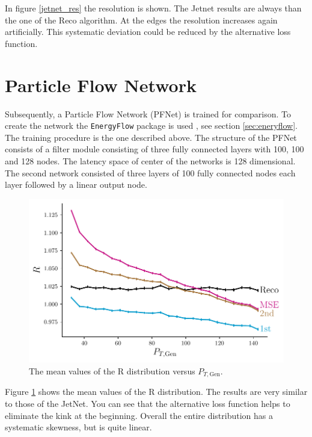 \documentclass[12pt, a4paper]{thesis}
\begin{document}
In figure \ref{jetnet_res} the resolution is shown. The Jetnet results
are always than the one of the Reco algorithm. At the edges the
resolution increases again artificially. This systematic deviation
could be reduced by the alternative loss function.

\clearpage
\section{Particle Flow Network}
\label{sec:org307355e}

Subsequently, a Particle Flow Network (PFNet) is trained for
comparison. To create the network the \texttt{EnergyFlow} package is
used \cite{komiske19_energ_flow_networ}, see section
\ref{sec:eneryflow}. The training procedure is the one described
above. The structure of the PFNet consists of a filter module
consisting of three fully connected layers with 100, 100 and 128
nodes. The latency space of center of the networks is 128
dimensional. The second network consisted of three layers of 100 fully
connected nodes each layer followed by a linear output node.

\begin{figure}[hbtp]
  \centering
  \includegraphics[width=.9\linewidth]{../images/pfnet_R.pdf}
  \caption{The mean values of the R distribution versus \(P_{T,
      \text{Gen}}\).}
  \label{pfnet_R}
\end{figure}

Figure \ref{pfnet_R} shows the mean values of the R distribution. The
results are very similar to those of the JetNet. You can see that the
alternative loss function helps to eliminate the kink at the
beginning.  Overall the entire distribution has a systematic skewness,
but is quite linear.
\end{document}
